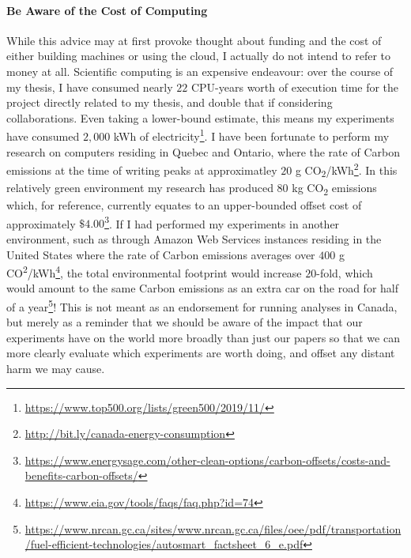 \paragraph*{Be Aware of the Cost of Computing}
While this advice may at first provoke thought about funding and the cost of either building machines or using the
cloud, I actually do not intend to refer to money at all. Scientific computing is an expensive endeavour: over the
course of my thesis, I have consumed nearly $22$ CPU-years worth of execution time for the project directly related
to my thesis, and double that if considering collaborations. Even taking a lower-bound estimate, this means my
experiments have consumed $2,000$ kWh of electricity\footnote{\url{https://www.top500.org/lists/green500/2019/11/}}.
I have been fortunate to perform my research on computers residing in Quebec and Ontario, where the rate of Carbon
emissions at the time of writing peaks at approximatley $20$ g
CO\textsubscript{2}/kWh\footnote{\url{http://bit.ly/canada-energy-consumption}}. In this relatively green
environment my research has produced $80$ kg CO\textsubscript{2} emissions which, for reference, currently equates
to an upper-bounded offset cost of approximately $\$4.00$\footnote{\url{https://www.energysage.com/other-clean-options/carbon-offsets/costs-and-benefits-carbon-offsets/}}.
If I had performed my experiments in another environment, such as through Amazon Web Services instances residing in
the United States where the rate of Carbon emissions averages over $400$ g
CO\textsuperscript{2}/kWh\footnote{\url{https://www.eia.gov/tools/faqs/faq.php?id=74}}, the total environmental
footprint would increase $20$-fold, which would amount to the same Carbon emissions as an extra car on the road for
half of a year\footnote{\url{https://www.nrcan.gc.ca/sites/www.nrcan.gc.ca/files/oee/pdf/transportation/fuel-efficient-technologies/autosmart_factsheet_6_e.pdf}}! This is not meant as an endorsement for running analyses in Canada, but merely as a reminder that we should be
aware of the impact that our experiments have on the world more broadly than just our papers so that we can more
clearly evaluate which experiments are worth doing, and offset any distant harm we may cause.

